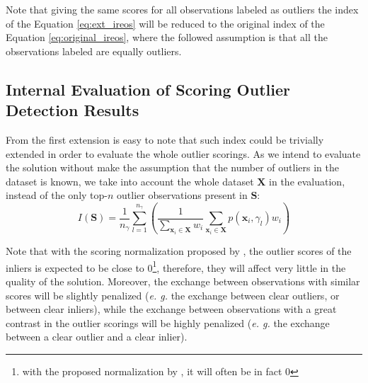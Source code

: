 Note that giving the same scores for all observations labeled as outliers the index of the Equation \ref{eq:ext_ireos} will be reduced to the original index of the Equation \ref{eq:original_ireos}, where the followed assumption is that all the observations labeled are equally outliers.

\subsection{Internal Evaluation of Scoring Outlier Detection Results}
From the first extension is easy to note that such index could be trivially extended in order to evaluate the whole outlier scorings. As we intend to evaluate the solution without make the assumption that the number of outliers in the dataset is known, we take into account the whole dataset $\mathbf{X}$ in the evaluation, instead of the only top-$n$ outlier observations present in $\mathbf{S}$:
\begin{equation}
I(\mathbf{S}) = \frac{1}{n_{\gamma}} \sum_{l = 1}^{n_{\gamma}} \left( \frac{1}{\sum_{\mathbf{x}_i \in \mathbf{X}} w_i} \sum_{\mathbf{x}_i \in \mathbf{X}} p(\mathbf{x}_i, \gamma_l) w_i \right)
\end{equation}

Note that with the scoring normalization proposed by \cite{kriegel2011}, the outlier scores of the inliers is expected to be close to 0\footnote{with the proposed normalization by \cite{kriegel2011}, it will often be in fact 0}, therefore, they will affect very little in the quality of the solution.  Moreover, the exchange between observations with similar scores will be slightly penalized (\textit{e. g.} the exchange between clear outliers, or between clear inliers), while the exchange between observations with a great contrast in the outlier scorings will be highly penalized (\textit{e. g.} the exchange between a clear outlier and a clear inlier).

